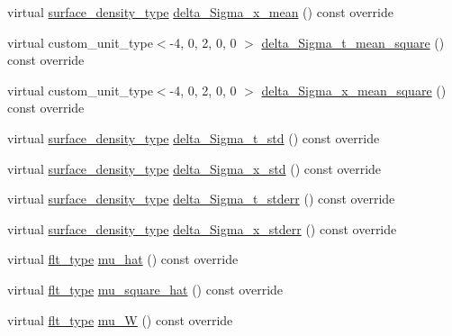 \begin{DoxyCompactItemize}
virtual \hyperlink{namespaceIceBRG_a80c597ef5ba0a32491d32a9f0083b02d}{surface\-\_\-density\-\_\-type} \hyperlink{classIceBRG_1_1pair__bin_a679e7a20930d08852c6c4fd9eca9f126}{delta\-\_\-\-Sigma\-\_\-x\-\_\-mean} () const override
\item 
virtual custom\-\_\-unit\-\_\-type$<$-\/4, 0, 2, 0, 0 $>$ \hyperlink{classIceBRG_1_1pair__bin_ad3c15af884bc5074edee7388a1da606b}{delta\-\_\-\-Sigma\-\_\-t\-\_\-mean\-\_\-square} () const override
\item 
virtual custom\-\_\-unit\-\_\-type$<$-\/4, 0, 2, 0, 0 $>$ \hyperlink{classIceBRG_1_1pair__bin_af8b30d6f2568753c7200c280cb353918}{delta\-\_\-\-Sigma\-\_\-x\-\_\-mean\-\_\-square} () const override
\item 
virtual \hyperlink{namespaceIceBRG_a80c597ef5ba0a32491d32a9f0083b02d}{surface\-\_\-density\-\_\-type} \hyperlink{classIceBRG_1_1pair__bin_a38a2f38e2f4a97ed21641c471e6011a1}{delta\-\_\-\-Sigma\-\_\-t\-\_\-std} () const override
\item 
virtual \hyperlink{namespaceIceBRG_a80c597ef5ba0a32491d32a9f0083b02d}{surface\-\_\-density\-\_\-type} \hyperlink{classIceBRG_1_1pair__bin_ab31ca9e34af863727ae642ec95174afc}{delta\-\_\-\-Sigma\-\_\-x\-\_\-std} () const override
\item 
virtual \hyperlink{namespaceIceBRG_a80c597ef5ba0a32491d32a9f0083b02d}{surface\-\_\-density\-\_\-type} \hyperlink{classIceBRG_1_1pair__bin_abd17f66f888eb808420b445b2dec2f57}{delta\-\_\-\-Sigma\-\_\-t\-\_\-stderr} () const override
\item 
virtual \hyperlink{namespaceIceBRG_a80c597ef5ba0a32491d32a9f0083b02d}{surface\-\_\-density\-\_\-type} \hyperlink{classIceBRG_1_1pair__bin_a626753cce2e35d56cd4a07a5e0d7ea16}{delta\-\_\-\-Sigma\-\_\-x\-\_\-stderr} () const override
\item 
virtual \hyperlink{lib_2IceBRG__main_2common_8h_ad0f130a56eeb944d9ef2692ee881ecc4}{flt\-\_\-type} \hyperlink{classIceBRG_1_1pair__bin_abad2af4939b8fe1c303db7af8748fa52}{mu\-\_\-hat} () const override
\item 
virtual \hyperlink{lib_2IceBRG__main_2common_8h_ad0f130a56eeb944d9ef2692ee881ecc4}{flt\-\_\-type} \hyperlink{classIceBRG_1_1pair__bin_a2b30f0bd4f0405e4b4ca86e525a1a4f9}{mu\-\_\-square\-\_\-hat} () const override
\item 
virtual \hyperlink{lib_2IceBRG__main_2common_8h_ad0f130a56eeb944d9ef2692ee881ecc4}{flt\-\_\-type} \hyperlink{classIceBRG_1_1pair__bin_a7974296df81879f06fcf62d36bdd64f4}{mu\-\_\-\-W} () const override
\end{DoxyCompactItemize}
